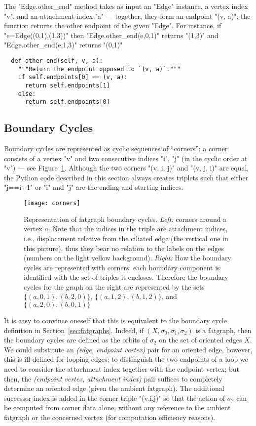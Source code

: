 The "Edge.other_end" method takes as input an "Edge" instance, a
vertex index "v", and an attachment index "a" --- together, they
form an endpoint "(v, a)"; the function returns the other endpoint
of the given "Edge".  For instance, if "e=Edge((0,1),(1,3))"
then "Edge.other_end(e,0,1)" returns "(1,3)" and
"Edge.other_end(e,1,3)" returns "(0,1)"
\begin{lstlisting}
  def other_end(self, v, a):
    """Return the endpoint opposed to `(v, a)`."""
    if self.endpoints[0] == (v, a):
      return self.endpoints[1]
    else:
      return self.endpoints[0]

\end{lstlisting}


\subsection{Boundary Cycles}
\label{sec:boundary-cycles}

Boundary cycles are represented as cyclic sequences of ``corners'': a
corner consists of a vertex "v" and two consecutive indices "i", "j"
(in the cyclic order at "v") --- see Figure~\ref{fig:corners}. 
Although the two corners "(v, i, j)" and "(v, j, i)" are equal, the
Python code described in this section always creates triplets such that
either "j==i+1" or "i" and "j" are the ending and starting indices.
\begin{figure}
  \centering
  \texttt{[image: corners]}
  \caption{Representation of fatgraph boundary cycles. \emph{Left:}
    corners around a vertex $a$. Note that the indices in the triple
    are attachment indices, i.e., displacement relative from the
    ciliated edge (the vertical one in this picture), thus they bear
    no relation to the labels on the edges (numbers on the light
    yellow background). \emph{Right:} How the boundary cycles are
    represented with corners: each boundary component is identified
    with the set of triples it encloses. Therefore the boundary cycles
    for the graph on the right are represented by the sets $\{(a,0,1),
    (b,2,0)\}$, $\{(a,1,2), (b,1,2)\}$, and $\{(a,2,0), (b,0,1)\}$}
  \label{fig:corners}
\end{figure}
It is easy to convince oneself that this is equivalent to the boundary
cycle definition in Section~\ref{sec:fatgraphs}.  Indeed, if $(X, \sigma_0,
\sigma_1, \sigma_2)$ is a fatgraph, then the boundary cycles are
defined as the orbits of $\sigma_2$ on the set of oriented edges
$X$. We could substitute an \emph{(edge, endpoint vertex)} pair for an
oriented edge, however, this is ill-defined for looping edges; to
distinguish the two endpoints of a loop we need to consider the
attachment index together with the endpoint vertex; but then, the
\emph{(endpoint vertex, attachment index)} pair suffices to completely
determine an oriented edge (given the ambient fatgraph).  The
additional successor index is added in the corner triple "(v,i,j)"
so that the action of $\sigma_2$ can be computed from corner data
alone, without any reference to the ambient fatgraph or the concerned
vertex (for computation efficiency reasons).

